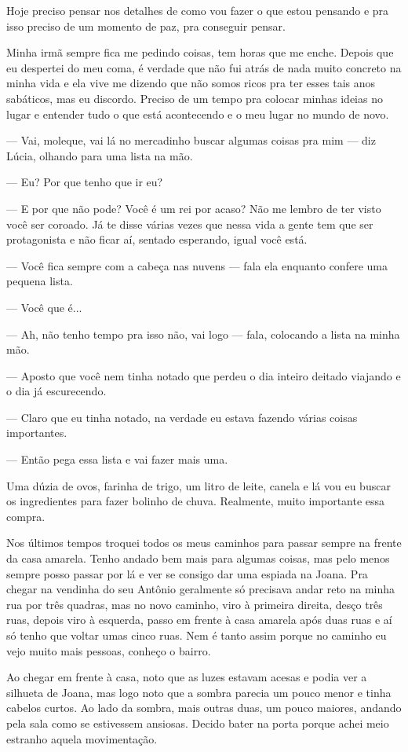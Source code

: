 Hoje preciso pensar nos detalhes de como vou fazer o que estou pensando e pra isso preciso de um momento de paz, pra conseguir pensar.

Minha irmã sempre fica me pedindo coisas, tem horas que me enche. Depois que eu despertei do meu coma, é verdade que não fui atrás de nada muito concreto na minha vida e ela vive me dizendo que não somos ricos pra ter esses tais anos sabáticos, mas eu discordo. Preciso de um tempo pra colocar minhas ideias no lugar e entender tudo o que está acontecendo e o meu lugar no mundo de novo.

— Vai, moleque, vai lá no mercadinho buscar algumas coisas pra mim — diz Lúcia, olhando para uma lista na mão.

— Eu? Por que tenho que ir eu?

— E por que não pode? Você é um rei por acaso? Não me lembro de ter visto você ser coroado. Já te disse várias vezes que nessa vida a gente tem que ser protagonista e não ficar aí, sentado esperando, igual você está.

— Você fica sempre com a cabeça nas nuvens — fala ela enquanto confere uma pequena lista.

— Você que é...

— Ah, não tenho tempo pra isso não, vai logo — fala, colocando a lista na minha mão.

— Aposto que você nem tinha notado que perdeu o dia inteiro deitado viajando e o dia já escurecendo.

— Claro que eu tinha notado, na verdade eu estava fazendo várias coisas importantes.

— Então pega essa lista e vai fazer mais uma.

Uma dúzia de ovos, farinha de trigo, um litro de leite, canela e lá vou eu buscar os ingredientes para fazer bolinho de chuva. Realmente, muito importante essa compra.

Nos últimos tempos troquei todos os meus caminhos para passar sempre na frente da casa amarela. Tenho andado bem mais para algumas coisas, mas pelo menos sempre posso passar por lá e ver se consigo dar uma espiada na Joana. Pra chegar na vendinha do seu Antônio geralmente só precisava andar reto na minha rua por três quadras, mas no novo caminho, viro à primeira direita, desço três ruas, depois viro à esquerda, passo em frente à casa amarela após duas ruas e aí só tenho que voltar umas cinco ruas. Nem é tanto assim porque no caminho eu vejo muito mais pessoas, conheço o bairro.

Ao chegar em frente à casa, noto que as luzes estavam acesas e podia ver a silhueta de Joana, mas logo noto que a sombra parecia um pouco menor e tinha cabelos curtos. Ao lado da sombra, mais outras duas, um pouco maiores, andando pela sala como se estivessem ansiosas. Decido bater na porta porque achei meio estranho aquela movimentação.

